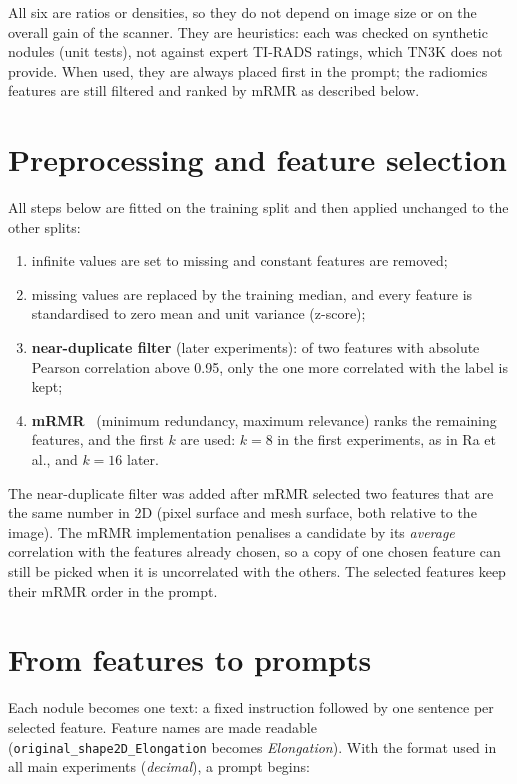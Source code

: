All six are ratios or densities, so they do not depend on image size or on the overall gain of
the scanner. They are heuristics: each was checked on synthetic nodules (unit tests), not against
expert TI-RADS ratings, which TN3K does not provide. When used, they are always placed first in
the prompt; the radiomics features are still filtered and ranked by mRMR as described below.

\section{Preprocessing and feature selection}
\label{sec:methods-selection}

All steps below are fitted on the training split and then applied unchanged to the other splits:

\begin{enumerate}
  \item infinite values are set to missing and constant features are removed;
  \item missing values are replaced by the training median, and every feature is standardised to
        zero mean and unit variance (z-score);
  \item \textbf{near-duplicate filter} (later experiments): of two features with absolute
        Pearson correlation above 0.95, only the one more correlated with the label is kept;
  \item \textbf{mRMR}~\citep{peng2005} (minimum redundancy, maximum relevance) ranks the remaining
        features, and the first $k$ are used: $k = 8$ in the first experiments, as in Ra et al.,
        and $k = 16$ later.
\end{enumerate}

The near-duplicate filter was added after mRMR selected two features that are the same number in
2D (pixel surface and mesh surface, both relative to the image). The mRMR implementation penalises
a candidate by its \emph{average} correlation with the features already chosen, so a copy of one
chosen feature can still be picked when it is uncorrelated with the others. The selected features
keep their mRMR order in the prompt.

\section{From features to prompts}
\label{sec:methods-prompts}

Each nodule becomes one text: a fixed instruction followed by one sentence per selected feature.
Feature names are made readable (\texttt{original\_shape2D\_Elongation} becomes
\emph{Elongation}). With the format used in all main experiments (\emph{decimal}), a prompt begins:

